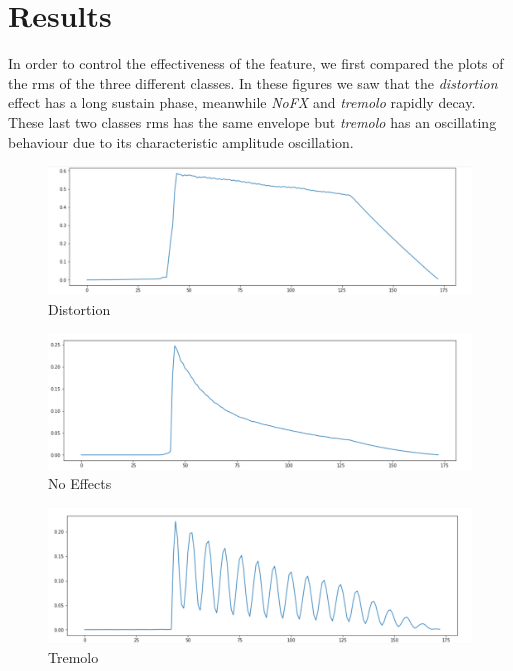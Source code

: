 \documentclass{article}
\begin{document}
\section{Results}
In order to control the effectiveness of the feature, we first compared the plots of the rms of the three different classes. In these figures we saw that the \emph{distortion} effect has a long sustain phase, meanwhile \emph{NoFX} and \emph{tremolo} rapidly decay. These last two classes rms has the same envelope but \emph{tremolo} has an oscillating behaviour due to its characteristic amplitude oscillation.\\

\begin{figure}[h]
\centering
\includegraphics[scale=.2]{distortion.png}
\caption{Distortion}
\end{figure}
\begin{figure}[h]
\centering
\includegraphics[scale=.2]{nofx.png}
\caption{No Effects}
\end{figure}
\begin{figure}[!h]
\centering
\includegraphics[scale=.2]{tremolo.png}
\caption{Tremolo}
\end{figure} 
\end{document}
